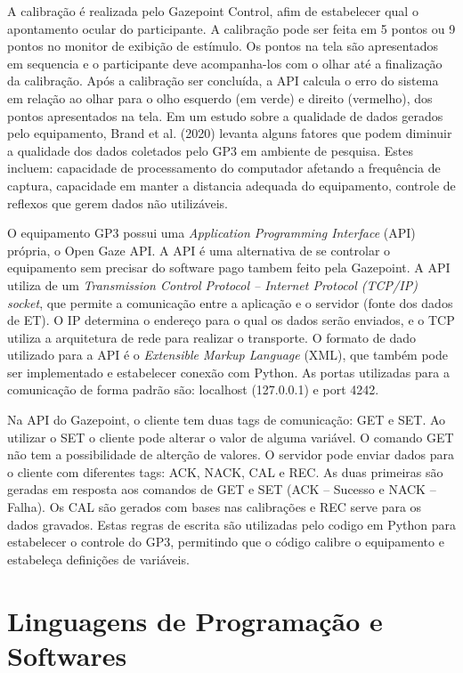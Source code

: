 A calibração é realizada pelo Gazepoint Control, afim de estabelecer qual o apontamento ocular do participante. 
A calibração pode ser feita em 5 pontos ou 9 pontos no monitor de exibição de estímulo. Os pontos na tela são apresentados
em sequencia e o participante deve acompanha-los com o olhar até a finalização da calibração. Após a calibração ser concluída, a API calcula o erro do sistema em relação ao olhar para o olho esquerdo (em verde) 
e direito (vermelho), dos pontos apresentados na tela. Em um estudo sobre a qualidade de dados gerados pelo 
equipamento, Brand et al. (2020) levanta alguns fatores que podem diminuir a qualidade dos dados coletados pelo GP3 
em ambiente de pesquisa. Estes incluem: capacidade de processamento do computador afetando a frequência de captura, 
capacidade em manter a distancia adequada do equipamento, controle de reflexos que gerem dados não utilizáveis. 


O  equipamento GP3 possui uma \textit{Application Programming Interface} (API) própria, 
o Open Gaze API. 
A API é uma alternativa de se controlar o equipamento sem precisar do software 
pago tambem feito pela Gazepoint. A API utiliza de um \textit{Transmission Control Protocol – Internet Protocol (TCP/IP) 
socket}, que permite a comunicação entre a aplicação e o servidor (fonte dos dados de ET). 
O IP determina o endereço para o qual os dados serão enviados, e o TCP utiliza a arquitetura de 
rede para realizar o transporte. O formato de dado utilizado para a API é o \textit{Extensible Markup Language} (XML), 
que também pode ser implementado e estabelecer conexão com Python. 
As portas utilizadas para a comunicação de forma padrão são: 
localhost (127.0.0.1) e port 4242. 


Na API do Gazepoint, o cliente tem duas tags de comunicação: GET e SET. 
Ao utilizar o SET o cliente pode alterar o valor de alguma variável. 
O comando GET não tem a possibilidade de alterção de valores. O servidor 
pode enviar dados para o cliente com diferentes tags: ACK, NACK, CAL e REC. 
As duas primeiras são geradas em resposta aos comandos de GET e SET (ACK – Sucesso e NACK –Falha). 
Os CAL são gerados com bases nas calibrações e REC serve para os dados gravados. 
Estas regras de escrita são utilizadas pelo codigo em Python para estabelecer o controle do GP3,
 permitindo que o código calibre o equipamento e estabeleça definições de variáveis.


\section{Linguagens de Programação e Softwares}


